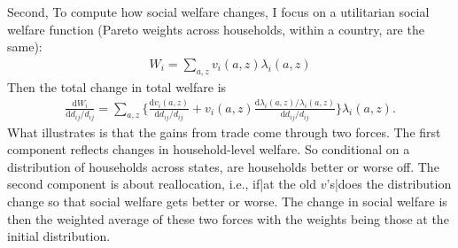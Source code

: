 \documentclass[12pt,pdftex]{article}
\begin{document}
\begin{onehalfspacing}
Second, To compute how social welfare changes, I focus on a utilitarian social welfare function (Pareto weights across households, within a country, are the same):
\begin{align}
W_{i} = \sum_{a,z} v_{i}(a,z)\lambda_{i}(a,z)
\label{eq:apx-social-welfare}
\end{align}
Then the total change in total welfare is
\begin{align}
\frac{\mathrm{d} W_{i}}{\mathrm{d} d_{ij} / d_{ij}} = \sum_{a,z} \bigg \{ \frac{\mathrm{d} v_i(a, z)}{\mathrm{d} d_{ij} / d_{ij}}  + v_{i}(a,z) \frac{\mathrm{d} \lambda_{i}(a,z)/ \lambda_{i}(a,z)}{\mathrm{d} d_{ij} / d_{ij}}  \bigg \} \lambda_{i}(a,z).
\label{eq:apx-social-welfare-change}
\end{align}
What illustrates is that the gains from trade come through two forces. The first component reflects changes in household-level welfare. So conditional on a distribution of households across states, are households better or worse off. The second component is about reallocation, i.e., if|at the old $v$'s|does the distribution change so that social welfare gets better or worse. The change in social welfare is then the weighted average of these two forces with the weights being those at the initial distribution.


\end{onehalfspacing}
\end{document}
